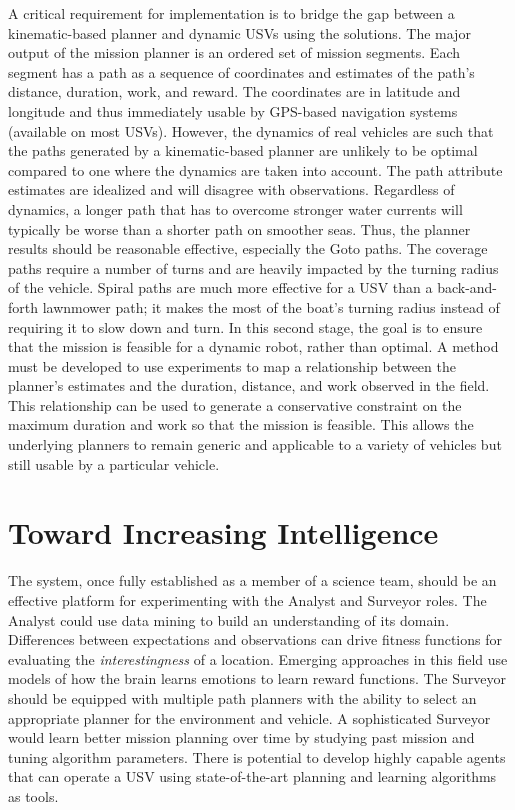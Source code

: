 \documentclass{tamuccthesis}
\begin{document}
A critical requirement for implementation is to bridge the gap between a kinematic-based planner and dynamic USVs using the solutions. The major output of the mission planner is an ordered set of mission segments. Each segment has a path as a sequence of coordinates and estimates of the path's distance, duration, work, and reward. The coordinates are in latitude and longitude and thus immediately usable by GPS-based navigation systems (available on most USVs). However, the dynamics of real vehicles are such that the paths generated by a kinematic-based planner are unlikely to be optimal compared to one where the dynamics are taken into account. The path attribute estimates are idealized and will disagree with observations. Regardless of dynamics, a longer path that has to overcome stronger water currents will typically be worse than a shorter path on smoother seas. Thus, the planner results should be reasonable effective, especially the Goto paths. The coverage paths require a number of turns and are heavily impacted by the turning radius of the vehicle. Spiral paths are much more effective for a USV than a back-and-forth lawnmower path; it makes the most of the boat's turning radius instead of requiring it to slow down and turn. In this second stage, the goal is to ensure that the mission is feasible for a dynamic robot, rather than optimal. A method must be developed to use experiments to map a relationship between the planner's estimates and the duration, distance, and work observed in the field. This relationship can be used to generate a conservative constraint on the maximum duration and work so that the mission is feasible. This allows the underlying planners to remain generic and applicable to a variety of vehicles but still usable by a particular vehicle. 

\section{Toward Increasing Intelligence}

The system, once fully established as a member of a science team, should be an effective platform for experimenting with the Analyst and Surveyor roles. The Analyst could use data mining to build an understanding of its domain. Differences between expectations and observations can drive fitness functions for evaluating the \textit{interestingness} of a location. Emerging approaches in this field use models of how the brain learns emotions to learn reward functions. The Surveyor should be equipped with multiple path planners with the ability to select an appropriate planner for the environment and vehicle. A sophisticated Surveyor would learn better mission planning over time by studying past mission and tuning algorithm parameters. There is potential to develop highly capable agents that can operate a USV using state-of-the-art planning and learning algorithms as tools.
\end{document}
